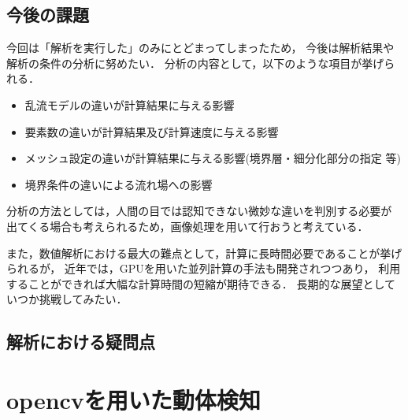 \documentclass[twocolumn,a4j]{jsarticle}
\begin{document}
\subsection{今後の課題}
今回は「解析を実行した」のみにとどまってしまったため，
今後は解析結果や解析の条件の分析に努めたい．
分析の内容として，以下のような項目が挙げられる．
\begin{itemize}
    \item 乱流モデルの違いが計算結果に与える影響
    \item 要素数の違いが計算結果及び計算速度に与える影響
    \item メッシュ設定の違いが計算結果に与える影響(境界層・細分化部分の指定 等)
    \item 境界条件の違いによる流れ場への影響
\end{itemize}
\par
分析の方法としては，人間の目では認知できない微妙な違いを判別する必要が
出てくる場合も考えられるため，画像処理を用いて行おうと考えている．
\par
また，数値解析における最大の難点として，計算に長時間必要であることが挙げられるが，
近年では，GPUを用いた並列計算の手法も開発されつつあり，
利用することができれば大幅な計算時間の短縮が期待できる．
長期的な展望としていつか挑戦してみたい．
\subsection{解析における疑問点}
\section{\large opencvを用いた動体検知}
\end{document}
